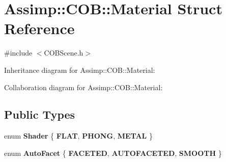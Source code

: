 \hypertarget{struct_assimp_1_1_c_o_b_1_1_material}{\section{Assimp\+:\+:C\+O\+B\+:\+:Material Struct Reference}
\label{struct_assimp_1_1_c_o_b_1_1_material}
}


{\ttfamily \#include $<$C\+O\+B\+Scene.\+h$>$}



Inheritance diagram for Assimp\+:\+:C\+O\+B\+:\+:Material\+:


Collaboration diagram for Assimp\+:\+:C\+O\+B\+:\+:Material\+:
\subsection*{Public Types}
\begin{DoxyCompactItemize}
\item 
\hypertarget{struct_assimp_1_1_c_o_b_1_1_material_a8702ad8bcc67d48ae741e7b368709eb9}{enum {\bfseries Shader} \{ {\bfseries F\+L\+A\+T}, 
{\bfseries P\+H\+O\+N\+G}, 
{\bfseries M\+E\+T\+A\+L}
 \}}\label{struct_assimp_1_1_c_o_b_1_1_material_a8702ad8bcc67d48ae741e7b368709eb9}

\item 
\hypertarget{struct_assimp_1_1_c_o_b_1_1_material_a2cf97ecb613da5fe594a2265c91fce30}{enum {\bfseries Auto\+Facet} \{ {\bfseries F\+A\+C\+E\+T\+E\+D}, 
{\bfseries A\+U\+T\+O\+F\+A\+C\+E\+T\+E\+D}, 
{\bfseries S\+M\+O\+O\+T\+H}
 \}}\label{struct_assimp_1_1_c_o_b_1_1_material_a2cf97ecb613da5fe594a2265c91fce30}

\end{DoxyCompactItemize}
